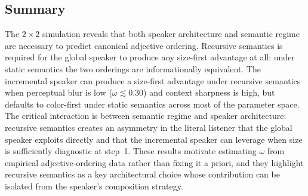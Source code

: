 \subsection{Summary}

The $2 \times 2$ simulation reveals that both speaker architecture and
semantic regime are necessary to predict canonical adjective ordering.
Recursive semantics is required for the global speaker to produce any
size-first advantage at all: under static semantics the two orderings
are informationally equivalent.
The incremental speaker can produce a size-first advantage under
recursive semantics when perceptual blur is low
($\omega \lesssim 0.30$) and context sharpness is high, but defaults
to color-first under static semantics across most of the parameter space.
The critical interaction is between semantic regime and speaker
architecture: recursive semantics creates an asymmetry in the literal
listener that the global speaker exploits directly and that the
incremental speaker can leverage when size is sufficiently diagnostic
at step~1.
These results motivate estimating $\omega$ from empirical
adjective-ordering data rather than fixing it a priori, and they
highlight recursive semantics as a key architectural choice whose
contribution can be isolated from the speaker's composition strategy.
